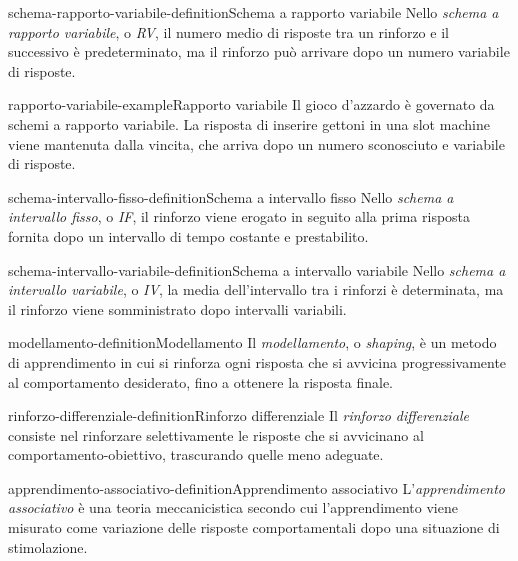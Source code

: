 \documentclass[preview]{standalone}
\begin{document}
\begin{snippetdefinition}{schema-rapporto-variabile-definition}{Schema a rapporto variabile}
    Nello \emph{schema a rapporto variabile}, o \emph{RV}, il numero medio di
    risposte tra un rinforzo e il successivo è predeterminato, ma il rinforzo
    può arrivare dopo un numero variabile di risposte.
\end{snippetdefinition}

\begin{snippetexample}{rapporto-variabile-example}{Rapporto variabile}
    Il gioco d'azzardo è governato da schemi a rapporto variabile. La risposta
    di inserire gettoni in una slot machine viene mantenuta dalla vincita, che
    arriva dopo un numero sconosciuto e variabile di risposte.
\end{snippetexample}


\begin{snippetdefinition}{schema-intervallo-fisso-definition}{Schema a intervallo fisso}
    Nello \emph{schema a intervallo fisso}, o \emph{IF}, il rinforzo viene
    erogato in seguito alla prima risposta fornita dopo un intervallo di tempo
    costante e prestabilito.
\end{snippetdefinition}

\begin{snippetdefinition}{schema-intervallo-variabile-definition}{Schema a intervallo variabile}
    Nello \emph{schema a intervallo variabile}, o \emph{IV}, la media
    dell'intervallo tra i rinforzi è determinata, ma il rinforzo viene
    somministrato dopo intervalli variabili.
\end{snippetdefinition}


\begin{snippetdefinition}{modellamento-definition}{Modellamento}
    Il \emph{modellamento}, o \emph{shaping}, è un metodo di apprendimento in
    cui si rinforza ogni risposta che si avvicina progressivamente al
    comportamento desiderato, fino a ottenere la risposta finale.
\end{snippetdefinition}

\begin{snippetdefinition}{rinforzo-differenziale-definition}{Rinforzo differenziale}
    Il \emph{rinforzo differenziale} consiste nel rinforzare selettivamente le
    risposte che si avvicinano al comportamento-obiettivo, trascurando quelle
    meno adeguate.
\end{snippetdefinition}

\begin{snippetdefinition}{apprendimento-associativo-definition}{Apprendimento associativo}
    L'\emph{apprendimento associativo} è una teoria meccanicistica secondo cui
    l'apprendimento viene misurato come variazione delle risposte
    comportamentali dopo una situazione di stimolazione.
\end{snippetdefinition}
\end{document}
